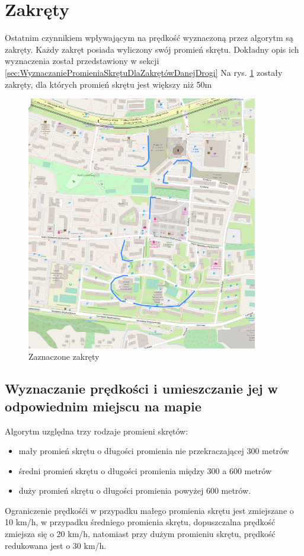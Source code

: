 \section{Zakręty}
\label{sec:zakretyMain}
Ostatnim czynnikiem wpływającym na prędkość wyznaczoną przez algorytm są zakręty. Każdy zakręt posiada wyliczony swój promień skrętu. Dokładny opis ich wyznaczenia został przedstawiony w sekcji \ref{sec:WyznaczaniePromieniaSkrętuDlaZakrętówDanejDrogi}
Na rys. \ref{sec:zakrety} zostały zakręty, dla których promień skrętu jest większy niż 50m
\begin{figure}[h]
\caption{Zaznaczone zakręty}
\label{sec:zakrety}
\centering
\includegraphics[width=0.9\textwidth]{zakrety}
\end{figure}

\newpage
\subsection{Wyznaczanie prędkości i umieszczanie jej w odpowiednim miejscu na mapie}
Algorytm uzględna trzy rodzaje promieni skrętów: 
\begin{itemize}
\item mały promień skrętu o długości promienia nie przekraczającej 300 metrów
\item średni promień skrętu o długości promienia między 300 a 600 metrów
\item duży promień skrętu o długości promienia powyżej 600 metrów.
\end{itemize}
Ograniczenie prędkośći w przypadku małego promienia skrętu jest zmiejszane o 10 km/h, w przypadku średniego promienia skrętu, dopuszczalna prędkość zmiejsza się o 20 km/h, natomiast przy dużym promieniu skrętu, prędkość redukowana jest o 30 km/h. 

